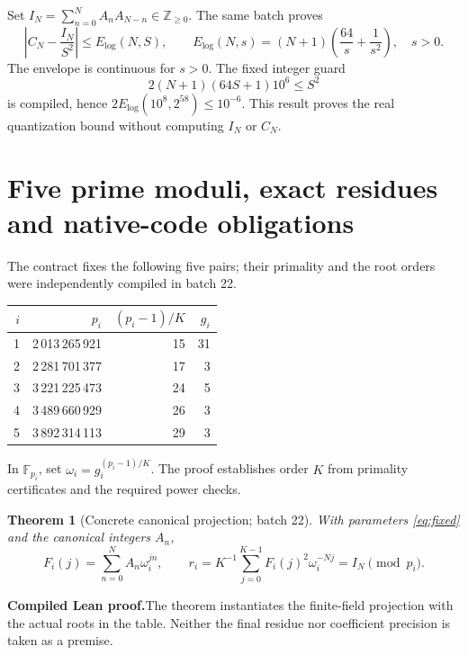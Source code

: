 \documentclass[11pt,a4paper]{article}
\newtheorem{theorem}{Theorem}[section]
\theoremstyle{remark}
\newcommand{\Z}{\mathbb Z}
\newcommand{\paid}{\textbf{Compiled Lean proof.}\space}
\begin{document}
Set $I_N=\sum_{n=0}^{N}A_nA_{N-n}\in\Z_{\ge0}$. The same batch proves
\begin{equation}\label{eq:E-log}
\left|C_N-\frac{I_N}{S^2}\right|\le E_{\log}(N,S),\qquad
E_{\log}(N,s)=(N+1)\left(\frac{64}{s}+\frac1{s^2}\right),\quad s>0.
\end{equation}
The envelope is continuous for $s>0$. The fixed integer guard
\begin{equation}\label{eq:q-guard}
2(N+1)(64S+1)10^6\le S^2
\end{equation}
is compiled, hence $2E_{\log}(10^8,2^{58})\le10^{-6}$. This result proves
the real quantization bound without computing $I_N$ or $C_N$.

\clearpage
\section{Five prime moduli, exact residues and native-code obligations}\label{sec:crt}
The contract fixes the following five pairs; their primality and the root
orders were independently compiled in batch 22.
\begin{center}
\begin{tabular}{@{}rrrr@{}}
\toprule
$i$ & $p_i$ & $(p_i-1)/K$ & $g_i$\\
\midrule
1 & 2\,013\,265\,921 & 15 & 31\\
2 & 2\,281\,701\,377 & 17 & 3\\
3 & 3\,221\,225\,473 & 24 & 5\\
4 & 3\,489\,660\,929 & 26 & 3\\
5 & 3\,892\,314\,113 & 29 & 3\\
\bottomrule
\end{tabular}
\end{center}
In $\mathbb F_{p_i}$, set $\omega_i=g_i^{(p_i-1)/K}$. The proof establishes
order $K$ from primality certificates and the required power checks.

\begin{theorem}[Concrete canonical projection; batch 22]
With parameters \eqref{eq:fixed} and the canonical integers $A_n$,
\begin{equation}\label{eq:ntt-projection}
F_i(j)=\sum_{n=0}^{N}A_n\omega_i^{jn},\qquad
r_i=K^{-1}\sum_{j=0}^{K-1}F_i(j)^2\omega_i^{-Nj}
=I_N\pmod {p_i}.
\end{equation}
\end{theorem}
\paid The theorem instantiates the finite-field projection with the
actual roots in the table. Neither the final residue nor coefficient
precision is taken as a premise.
\end{document}
